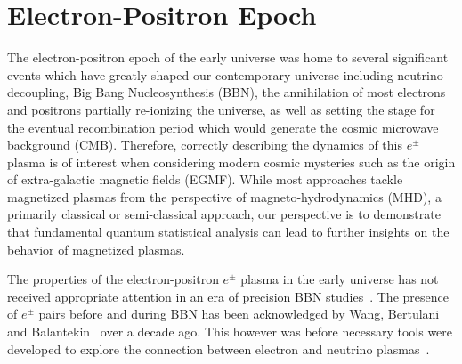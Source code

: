 \documentclass[Universe,article,submit,moreauthors,pdftex]{Definitions/mdpi}
\begin{document}
\section{Electron-Positron Epoch}\label{sec:ElectronPositron}
The electron-positron epoch of the early universe was home to several significant events which have greatly shaped our contemporary universe including neutrino decoupling, Big Bang Nucleosynthesis (BBN), the annihilation of most electrons and positrons partially re-ionizing the universe, as well as setting the stage for the eventual recombination period which would generate the cosmic microwave background (CMB). Therefore, correctly describing the dynamics of this $e^{\pm}$ plasma is of interest when considering modern cosmic mysteries such as the origin of extra-galactic magnetic fields (EGMF). While most approaches tackle magnetized plasmas from the perspective of magneto-hydrodynamics (MHD), a primarily classical or semi-classical approach, our perspective is to demonstrate that fundamental quantum statistical analysis can lead to further insights on the behavior of magnetized plasmas.

The properties of the electron-positron $e^{\pm}$ plasma in the early universe has not received appropriate attention in an era of precision BBN studies~\cite{Pitrou:2018cgg}. The presence of $e^{\pm}$ pairs before and during BBN has been acknowledged by Wang, Bertulani and Balantekin~\cite{Wang:2010px} over a decade ago. This however was before necessary tools were developed to explore the connection between electron and neutrino plasmas~\cite{Mangano:2005cc,Birrell:2012gg,Birrell:2014uka}. 
\end{document}
